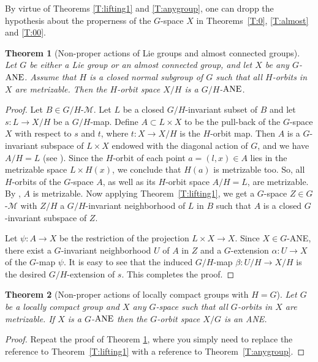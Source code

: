 \documentclass{amsart}
\newtheorem{theorem}{Theorem}[section]
\begin{document}
\medskip


By virtue of Theorems \ref{T:lifting1} and \ref{T:anygroup}, one can dropp the hypothesis about the properness of the $G$-space $X$ in Theorems~\ref{T:0},  \ref{T:almost} and \ref{T:00}.

\begin{theorem}[Non-proper actions of Lie groups and almost connected groups]\label{T:NP1}
 Let   $G$ be either a Lie group or an almost connected  group,
 and let $X$ be any  $G$-${\rm {\rm ANE}}$. Assume that $H$ is a closed  normal subgroup of $G$
such that all  $H$-orbits in $X$ are metrizable. Then the $H$-orbit space $X/H$ is a $G/H$-${\rm
ANE}$.
\end{theorem}

\begin{proof} Let  $B\in G/H$-$\mathcal M$. Let $L$ be  a closed
$G/H$-invariant subset of $B$ and let $s:L\to X/H$ be  a $G/H$-map. Define $A\subset L\times X$ to
be the pull-back of the $G$-space $X$ with respect to $s$ and $t$, where $t:X\to X/H$ is the
$H$-orbit map. Then $A$ is a $G$-invariant subspace of $L\times X$ endowed with the diagonal action
of $G$, and we have $A/H=L$ (see \cite[Ch.~4, Proposition~4.1]{huse:94}). Since the $H$-orbit of
each point $a=(l,x)\in A$ lies in the metrizable  space $L\times H(x)$, we conclude that $H(a)$ is
metrizable too. So, all $H$-orbits of the $G$-space $A$, as well as its $H$-orbit space $A/H=L$, are
metrizable. By \cite[Theorem 6.1]{ant:fund09}, $A$ is metrizable. Now applying  Theorem~\ref{T:lifting1},
 we get a $G$-space $Z\in G$-$\mathcal M$  with $Z/H$ a
$G/H$-invariant neighborhood of $L$ in $B$ such that $A$ is a closed
$G$-invariant subspace of $Z$.

Let $\psi:A\to X$ be the restriction of the projection $L\times
X\to X$. Since $X\in G$-ANE, there
exist a $G$-invariant neighborhood $U$ of $A$ in $Z$  and a $G$-extension $\alpha:U\to X$ of the $G$-map $\psi$.
It is easy to see that the induced $G/H$-map $\beta:U/H\to X/H$ is
the desired $G/H$-extension of $s$. This completes the proof.
\end{proof}

\medskip

\begin{theorem}[Non-proper actions of locally compact groups with $H=G$]\label{T:NP2}
Let $G$ be a locally compact  group and $X$   any $G$-space such that  all  $G$-orbits in $X$ are metrizable. 
 If  $X$ is a $G$-${\rm ANE}$ then the $G$-orbit space  $X/G$ is an {\rm ANE}. 
\end{theorem}
\begin{proof} Repeat the proof of Theorem \ref{T:NP1}, where you  simply need to replace the reference to Theorem~\ref{T:lifting1} with a reference to Theorem~\ref{T:anygroup}. 
\end{proof}
\end{document}
